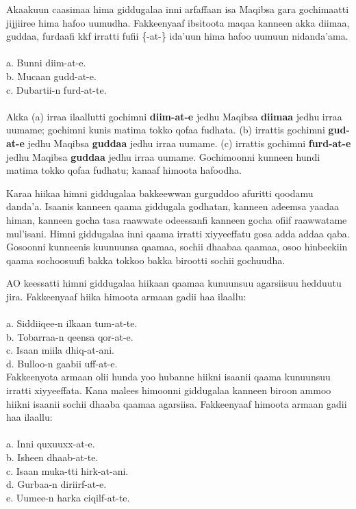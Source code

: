 \documentclass[11pt,b5paper]{book}
\begin{document}
Akaakuun caasimaa hima giddugalaa inni arfaffaan isa Maqibsa gara gochimaatti jijjiiree hima hafoo uumudha. Fakkeenyaaf ibsitoota maqaa kanneen akka diimaa, guddaa, furdaafi kkf irratti fufii \{-at-\} ida’uun hima hafoo uumuun nidanda’ama.\\
\\
a. Bunni diim-at-e.\\
b. Mucaan gudd-at-e.\\
c. Dubartii-n furd-at-te. \\
\\
Akka (a) irraa ilaallutti gochimni \textbf{diim-at-e} jedhu Maqibsa \textbf{diimaa} jedhu irraa uumame; gochimni kunis matima tokko qofaa fudhata. (b) irrattis gochimni \textbf{gud-at-e} jedhu Maqibsa \textbf{guddaa} jedhu irraa uumame. (c) irrattis gochimni \textbf{furd-at-e}
jedhu Maqibsa \textbf{guddaa} jedhu irraa uumame. Gochimoonni kunneen hundi matima tokko qofaa fudhatu; kanaaf himoota hafoodha.

Karaa hiikaa himni giddugalaa bakkeewwan gurguddoo afuritti qoodamu danda’a. Isaanis kanneen qaama giddugala godhatan, kanneen adeemsa yaadaa himan, kanneen gocha tasa raawwate odeessanfi kanneen gocha ofiif raawwatame mul’isani. Himni giddugalaa inni qaama irratti xiyyeeffatu gosa adda addaa
qaba. Gosoonni kunneenis kuunuunsa qaamaa, sochii dhaabaa qaamaa, osoo hinbeekiin qaama sochoosuufi bakka tokkoo bakka birootti sochii gochuudha.

AO keessatti himni giddugalaa hiikaan qaamaa kunuunsuu agarsiisuu hedduutu jira. Fakkeenyaaf hiika himoota armaan gadii haa ilaallu: \\
\\
a. Siddiiqee-n ilkaan tum-at-te.\\
b. Tobarraa-n qeensa qor-at-e.\\
c. Isaan miila dhiq-at-ani.\\
d. Bulloo-n gaabii uff-at-e.\\

Fakkeenyota armaan olii hunda yoo hubanne hiikni isaanii qaama kunuunsuu irratti xiyyeeffata. Kana malees himoonni giddugalaa kanneen biroon ammoo hiikni isaanii sochii dhaaba qaamaa agarsiisa. Fakkeenyaaf himoota armaan gadii haa ilaallu:\\
\\
a. Inni quxuuxx-at-e. \\
b. Isheen dhaab-at-te.\\
c. Isaan muka-tti hirk-at-ani.\\
d. Gurbaa-n diriirf-at-e.\\
e. Uumee-n harka ciqilf-at-te.\\
\end{document}
